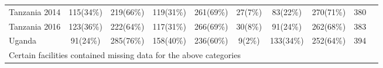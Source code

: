 \begin{tabular}{l*{9}{c}}
Tanzania 2014&     {115(34\%)}&  {219(66\%)}&    {119(31\%)}&  {261(69\%)}&        {27(7\%)}&             {83(22\%)}&             {270(71\%)}&             {380}\\
Tanzania 2016&     {123(36\%)}&  {222(64\%)}&    {117(31\%)}&  {266(69\%)}&        {30(8\%)}&             {91(24\%)}&             {262(68\%)}&             {383}\\
Uganda&                {91(24\%)}&  {285(76\%)}&        {158(40\%)}&  {236(60\%)}&        {9(2\%)}&             {133(34\%)}&             {252(64\%)}&             {394}\\
\hline\hline
\multicolumn{9}{l}{\footnotesize Certain facilities contained missing data for the above categories}\\
\end{tabular}